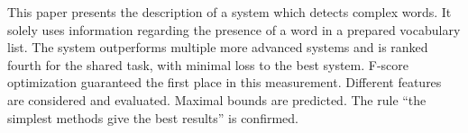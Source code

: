 This paper presents the description of a system which detects complex words. It solely uses information regarding the presence of a word in a prepared vocabulary list. The system outperforms multiple more advanced systems and is ranked fourth for the shared task, with minimal loss to the best system. F-score optimization guaranteed the first place in this measurement. Different features are considered and evaluated. Maximal bounds are predicted. The rule ``the simplest methods give the best results'' is confirmed.
